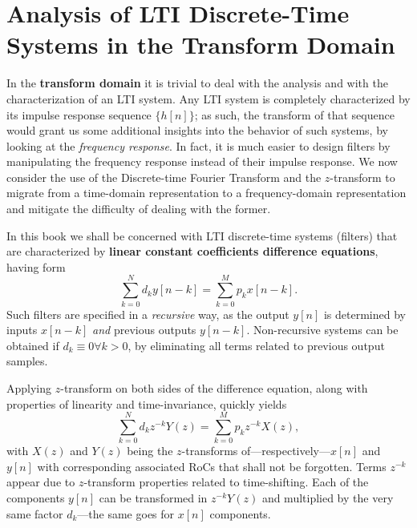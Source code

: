 \documentclass[\documentfontsize, twocolumn]{\classname}
\begin{document}
\chapter{Analysis of LTI Discrete-Time Systems in the Transform Domain}

In the \textbf{transform domain} it is trivial to deal with the analysis and with the characterization of an LTI system. Any LTI system is completely characterized by its impulse response sequence $\{h[n]\}$; as such, the transform of that sequence would grant us some additional insights into the behavior of such systems, by looking at the \emph{frequency response}. In fact, it is much easier to design filters by manipulating the frequency response instead of their impulse response. We now consider the use of the Discrete-time Fourier Transform and the $z$-transform to migrate from a time-domain representation to a frequency-domain representation and mitigate the difficulty of dealing with the former.

In this book we shall be concerned with LTI discrete-time systems (filters) that are characterized by \textbf{linear constant coefficients difference equations}, having form
\begin{equation}\label{eqn:ltiDiscreteTimeLinearConstantCoefficientsDifference}
    \sum_{k=0}^N d_k y[n-k] = \sum_{k=0}^M p_k x[n-k].
\end{equation}
Such filters are specified in a \emph{recursive} way, as the output $y[n]$ is determined by inputs $x[n - k]$ \emph{and} previous outputs $y[n-k]$. Non-recursive systems can be obtained if $d_k \equiv 0 \forall k > 0$, by eliminating all terms related to previous output samples.

Applying $z$-transform on both sides of the difference equation, along with properties of linearity and time-invariance, quickly yields
\begin{equation}\label{eqn:zTransformLtiDiscreteTimeLinearConstantCoefficientsDifference}
    \sum_{k=0}^N d_k z^{-k} Y(z) = \sum_{k=0}^M p_k z^{-k} X(z),
\end{equation}
with $X(z)$ and $Y(z)$ being the $z$-transforms of---respectively---$x[n]$ and $y[n]$ with corresponding associated RoCs that shall not be forgotten. Terms $z^{-k}$ appear due to $z$-transform properties related to time-shifting. Each of the components $y[n]$ can be transformed in $z^{-k}Y(z)$ and multiplied by the very same factor $d_k$---the same goes for $x[n]$ components.
\end{document}
